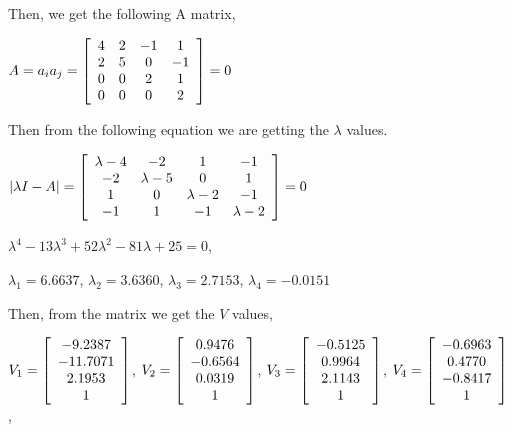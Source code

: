 \documentclass[]{article}
\begin{document}
Then, we get the following A matrix,

\centerline {
	$A = a_ia_j = \left[ {\begin{array}{*{20}c}
		4 & 2 & -1 & 1 \\
		2 & 5 & 0 & -1 \\ 
		0 & 0 & 2 &  1 \\
		0 & 0 & 0 & 2  
		\end{array} } \right] = 0 $ 
}

Then from the following equation we are getting the $\lambda$ values. 

\centerline {
	$|\lambda I - A| = \left[ {\begin{array}{*{20}c}
		\lambda - 4 & -2 & 1 & -1 \\
		-2 & \lambda - 5 & 0 & 1 \\ 
		1 & 0 & \lambda - 2 &  -1 \\
		-1 & 1 & -1 & \lambda - 2  
		\end{array} } \right] = 0$
}

\centerline {
	$\lambda ^4 - 13 \lambda ^3 + 52 \lambda ^2 - 81 \lambda + 25 = 0$, 
}

\centerline {
	$\lambda _1 = 6.6637$, $\lambda _2 = 3.6360$, $\lambda _3 = 2.7153$, $\lambda _4 = -0.0151$
}

Then, from the matrix we get the $V$ values, 

\centerline {
	$V_1 = \left[ {\begin{array}{*{20}c}
		-9.2387 \\
		-11.7071 \\ 
		2.1953 \\
		1  
		\end{array} } \right]$, 
	$V_2 = \left[ {\begin{array}{*{20}c}
		0.9476 \\
		-0.6564 \\ 
		0.0319 \\
		1  
		\end{array} } \right]$, 
	$V_3 = \left[ {\begin{array}{*{20}c}
		-0.5125 \\
		0.9964 \\ 
		2.1143 \\
		1  
		\end{array} } \right]$,
	$V_4 = \left[ {\begin{array}{*{20}c}
		-0.6963 \\
		0.4770 \\ 
		-0.8417 \\
		1  
		\end{array} } \right]$,  
}
\end{document}
